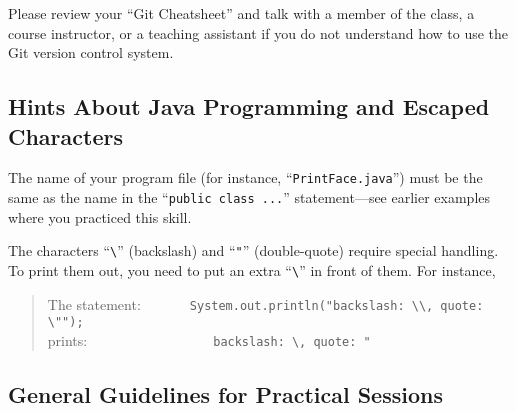Please review your ``Git Cheatsheet'' and talk with a member of the class, a course instructor, or a teaching assistant
if you do not understand how to use the Git version control system.

\vspace*{-.1in}
\subsection*{Hints About Java Programming and Escaped Characters}

The name of your program file (for instance, ``{\tt PrintFace.java}'') must be the same as the name in the ``{\tt public
  class ...}'' statement---see earlier examples where you practiced this skill.

The characters ``\verb$\$'' (backslash) and ``\verb$"$'' (double-quote)
require special handling. To print them out, you need to put an extra
``\verb$\$'' in front of them. For instance,
\begin{quote}
The statement:\ \ \ \ \ \ \ \verb$System.out.println("backslash: \\, quote: \"");$\\
prints:\ \ \ \ \ \ \ \ \ \ \ \ \ \ \ \ \ \ 
\verb$backslash: \, quote: "$
\end{quote}

\vspace*{-.2in}
\subsection*{General Guidelines for Practical Sessions}

